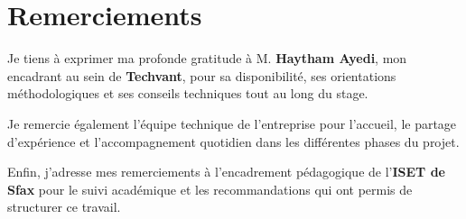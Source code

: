 \chapter*{Remerciements}

Je tiens à exprimer ma profonde gratitude à M. \textbf{Haytham Ayedi}, mon encadrant au sein de \textbf{Techvant}, pour sa disponibilité, ses orientations méthodologiques et ses conseils techniques tout au long du stage.

Je remercie également l'équipe technique de l'entreprise pour l'accueil, le partage d'expérience et l'accompagnement quotidien dans les différentes phases du projet.

Enfin, j'adresse mes remerciements à l'encadrement pédagogique de l'\textbf{ISET de Sfax} pour le suivi académique et les recommandations qui ont permis de structurer ce travail.
